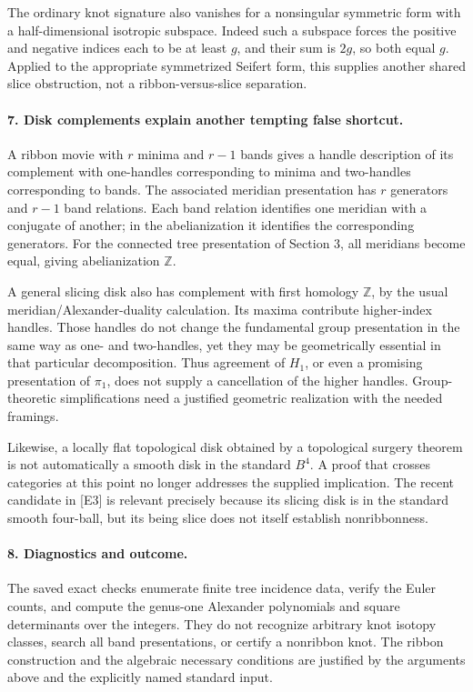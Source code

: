 \documentclass[11pt]{article}
\begin{document}
The ordinary knot signature also vanishes for a nonsingular symmetric form with a half-dimensional isotropic subspace. Indeed such a subspace forces the positive and negative indices each to be at least $g$, and their sum is $2g$, so both equal $g$. Applied to the appropriate symmetrized Seifert form, this supplies another shared slice obstruction, not a ribbon-versus-slice separation.

\paragraph{7. Disk complements explain another tempting false shortcut.}
A ribbon movie with $r$ minima and $r-1$ bands gives a handle description of its complement with one-handles corresponding to minima and two-handles corresponding to bands. The associated meridian presentation has $r$ generators and $r-1$ band relations. Each band relation identifies one meridian with a conjugate of another; in the abelianization it identifies the corresponding generators. For the connected tree presentation of Section 3, all meridians become equal, giving abelianization $\mathbb Z$.

A general slicing disk also has complement with first homology $\mathbb Z$, by the usual meridian/Alexander-duality calculation. Its maxima contribute higher-index handles. Those handles do not change the fundamental group presentation in the same way as one- and two-handles, yet they may be geometrically essential in that particular decomposition. Thus agreement of $H_1$, or even a promising presentation of $\pi_1$, does not supply a cancellation of the higher handles. Group-theoretic simplifications need a justified geometric realization with the needed framings.

Likewise, a locally flat topological disk obtained by a topological surgery theorem is not automatically a smooth disk in the standard $B^4$. A proof that crosses categories at this point no longer addresses the supplied implication. The recent candidate in [E3] is relevant precisely because its slicing disk is in the standard smooth four-ball, but its being slice does not itself establish nonribbonness.

\paragraph{8. Diagnostics and outcome.}
The saved exact checks enumerate finite tree incidence data, verify the Euler counts, and compute the genus-one Alexander polynomials and square determinants over the integers. They do not recognize arbitrary knot isotopy classes, search all band presentations, or certify a nonribbon knot. The ribbon construction and the algebraic necessary conditions are justified by the arguments above and the explicitly named standard input.
\end{document}
